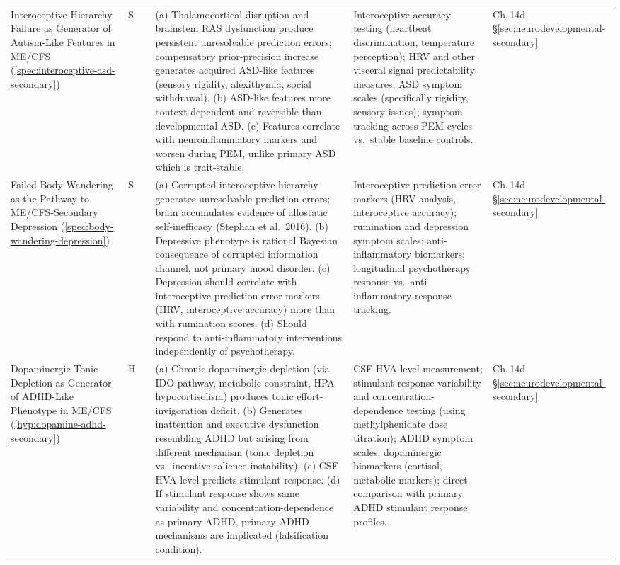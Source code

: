 \begin{longtable}{%
  p{3.0cm}
  >{\centering\arraybackslash}p{0.55cm}
  >{\centering\arraybackslash}p{1.0cm}
  p{3.8cm}
  p{3.8cm}
  p{2.2cm}
}
Interoceptive Hierarchy Failure as Generator of Autism-Like Features in ME/CFS
(\ref{spec:interoceptive-asd-secondary})
&
S & 0.30
&
(a) Thalamocortical disruption and brainstem RAS dysfunction produce persistent
unresolvable prediction errors; compensatory prior-precision increase generates
acquired ASD-like features (sensory rigidity, alexithymia, social withdrawal).
(b) ASD-like features more context-dependent and reversible than developmental ASD.
(c) Features correlate with neuroinflammatory markers and worsen during PEM,
unlike primary ASD which is trait-stable.
&
Interoceptive accuracy testing (heartbeat discrimination, temperature perception);
HRV and other visceral signal predictability measures; ASD symptom scales
(specifically rigidity, sensory issues); symptom tracking across PEM cycles vs.\
stable baseline controls.
&
Ch.\,14d \S\ref{sec:neurodevelopmental-secondary} \\[6pt]

Failed Body-Wandering as the Pathway to ME/CFS-Secondary Depression
(\ref{spec:body-wandering-depression})
&
S & 0.40
&
(a) Corrupted interoceptive hierarchy generates unresolvable prediction errors;
brain accumulates evidence of allostatic self-inefficacy (Stephan et al.\ 2016).
(b) Depressive phenotype is rational Bayesian consequence of corrupted information
channel, not primary mood disorder.
(c) Depression should correlate with interoceptive prediction error markers (HRV,
interoceptive accuracy) more than with rumination scores.
(d) Should respond to anti-inflammatory interventions independently of psychotherapy.
&
Interoceptive prediction error markers (HRV analysis, interoceptive accuracy);
rumination and depression symptom scales; anti-inflammatory biomarkers;
longitudinal psychotherapy response vs.\ anti-inflammatory response tracking.
&
Ch.\,14d \S\ref{sec:neurodevelopmental-secondary} \\[6pt]

Dopaminergic Tonic Depletion as Generator of ADHD-Like Phenotype in ME/CFS
(\ref{hyp:dopamine-adhd-secondary})
&
H & 0.45
&
(a) Chronic dopaminergic depletion (via IDO pathway, metabolic constraint,
HPA hypocortisolism) produces tonic effort-invigoration deficit.
(b) Generates inattention and executive dysfunction resembling ADHD but arising
from different mechanism (tonic depletion vs.\ incentive salience instability).
(c) CSF HVA level predicts stimulant response.
(d) If stimulant response shows same variability and concentration-dependence as
primary ADHD, primary ADHD mechanisms are implicated (falsification condition).
&
CSF HVA level measurement; stimulant response variability and concentration-dependence
testing (using methylphenidate dose titration); ADHD symptom scales; dopaminergic
biomarkers (cortisol, metabolic markers); direct comparison with primary ADHD
stimulant response profiles.
&
Ch.\,14d \S\ref{sec:neurodevelopmental-secondary} \\[6pt]


\end{longtable}
